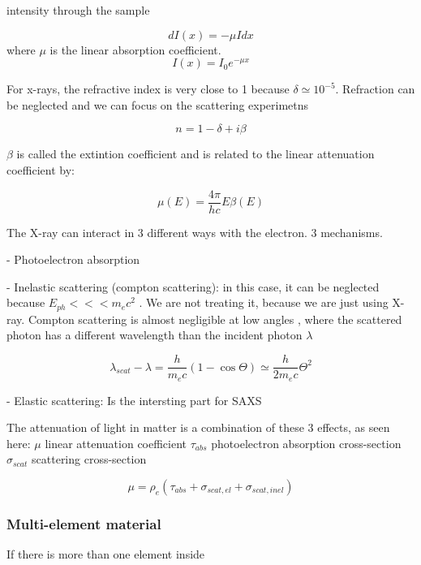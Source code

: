 intensity through the sample

\begin{equation}
        dI\left( x \right)=-\mu I dx
\end{equation}
where $\mu$ is the linear absorption coefficient.
\begin{equation}
        I\left( x \right)=I_0e^{-\mu x}
\end{equation}

For x-rays, the refractive index is very close to 1 because $\delta\simeq10^{-5}$. Refraction can be neglected and we can focus on the scattering experimetns

\begin{equation}
        n = 1 - \delta +i \beta
\end{equation}

$\beta$ is called the extintion coefficient and is related to the linear attenuation coefficient by:

\begin{equation}
        \mu (E) = \frac{4\pi}{hc} E \beta(E)
\end{equation}

The X-ray can interact in 3 different ways with the electron. 3 mechanisms.

- Photoelectron absorption

- Inelastic scattering (compton scattering): in this case, it can be neglected because $E_{ph}<<< m_ec^2$ . We are not treating it, because we are just using X-ray. Compton scattering is almost negligible at low angles , where the scattered photon has a different wavelength than the incident photon $\lambda$

\begin{equation}
        \lambda_{scat}-\lambda = \frac{h}{m_e c}\left( 1 - \cos{\Theta} \right) \simeq \frac{h}{2m_e c} \Theta ^ 2
\end{equation}

- Elastic scattering: Is the intersting part for SAXS

The attenuation of light in matter is a combination of these 3 effects, as seen here: $\mu$ linear attenuation coefficient $\tau_{abs}$ photoelectron absorption cross-section $\sigma_{scat}$ scattering cross-section

\begin{equation}
        \mu = \rho_e (\tau_{abs}+\sigma_{scat, el}+\sigma_{scat, inel})
\end{equation}

\subsubsection{Multi-element material}
If there is more than one element inside

